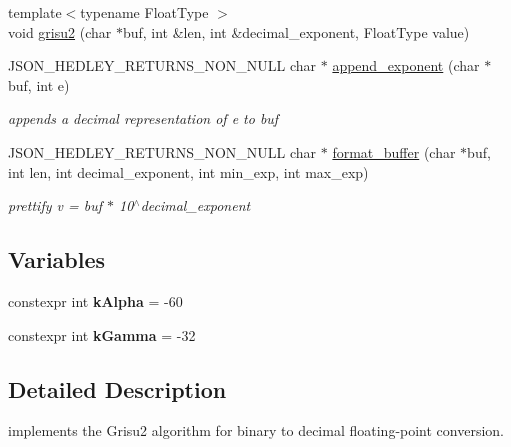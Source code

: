 \begin{DoxyCompactItemize}
\item 
{\footnotesize template$<$typename Float\+Type $>$ }\\void \hyperlink{namespacenlohmann_1_1detail_1_1dtoa__impl_aab7a9670a4f4704a5d0347ad7588576b}{grisu2} (char $\ast$buf, int \&len, int \&decimal\+\_\+exponent, Float\+Type value)
\item 
J\+S\+O\+N\+\_\+\+H\+E\+D\+L\+E\+Y\+\_\+\+R\+E\+T\+U\+R\+N\+S\+\_\+\+N\+O\+N\+\_\+\+N\+U\+LL char $\ast$ \hyperlink{namespacenlohmann_1_1detail_1_1dtoa__impl_ad90f19ed10d8133b727df4b9bc5ddf5c}{append\+\_\+exponent} (char $\ast$buf, int e)
\begin{DoxyCompactList}\small\item\em appends a decimal representation of e to buf \end{DoxyCompactList}\item 
J\+S\+O\+N\+\_\+\+H\+E\+D\+L\+E\+Y\+\_\+\+R\+E\+T\+U\+R\+N\+S\+\_\+\+N\+O\+N\+\_\+\+N\+U\+LL char $\ast$ \hyperlink{namespacenlohmann_1_1detail_1_1dtoa__impl_ab441f2761e33839ca48bc2225e14a2a9}{format\+\_\+buffer} (char $\ast$buf, int len, int decimal\+\_\+exponent, int min\+\_\+exp, int max\+\_\+exp)
\begin{DoxyCompactList}\small\item\em prettify v = buf $\ast$ 10$^\wedge$decimal\+\_\+exponent \end{DoxyCompactList}\end{DoxyCompactItemize}
\subsection*{Variables}
\begin{DoxyCompactItemize}
\item 
\mbox{\label{namespacenlohmann_1_1detail_1_1dtoa__impl_ac1ea1316de0b4a219f707c76b1db1966}} 
constexpr int {\bfseries k\+Alpha} = -\/60
\item 
\mbox{\label{namespacenlohmann_1_1detail_1_1dtoa__impl_a4a750fcc38da1ce68b7e25ab3a230e20}} 
constexpr int {\bfseries k\+Gamma} = -\/32
\end{DoxyCompactItemize}


\subsection{Detailed Description}
implements the Grisu2 algorithm for binary to decimal floating-\/point conversion. 

